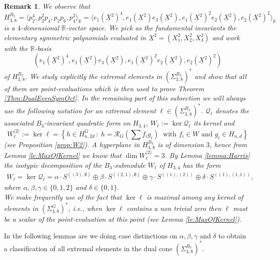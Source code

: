 \documentclass[11pt,a4paper]{amsart}
\numberwithin{equation}{section}
\newtheorem{remark}[thm]{Remark}
\theoremstyle{definition}
\newcommand{\R}{\mathbb{R}}
\numberwithin{thm}{section}
\theoremstyle{break}
\numberwithin{subcase}{case}
\begin{document}
 \begin{remark}\label{rmk:isotypic decomp H38Bn}
 We observe that \[ H_{3,8}^{B_3} = \langle p_2^4, p_2^2 p_4, p_2p_6, p_4^2 \rangle_\R = \langle e_1(\underline{X}^2)^4, e_1(\underline{X}^2)e_3(\underline{X}^2), e_1(\underline{X}^2)^2e_2(\underline{X}^2), e_2(\underline{X}^2)^2 \rangle_\R \] is a $4$-dimensional $\R$-vector space. We pick as the fundamental invariants the elementary symmetric polynomials evaluated in $\underline{X}^2=(X_1^2,X_2^2,X_3^2)$ and work with the $\R$-basis $$\left(e_1(\underline{X}^2)^4, e_1(\underline{X}^2)e_3(\underline{X}^2), e_1(\underline{X}^2)^2 e_2(\underline{X}^2), e_2(\underline{X}^2)^2\right)$$ of $H_{3,8}
^{B_3}$. We study explicitly the extremal elements in $\left( \Sigma_{3,8}^{B_3}\right)^\ast$ and show that all of them are point-evaluations which is then used to prove Theorem \ref{Thm:DualEvenSymOct}. In the remaining part of this subsection we will always use the following notation for an extremal element $\ell \in \left( \Sigma_{3,8}^{B_3}\right)^\ast$. $\mathcal{Q}_\ell$ denotes the associated $B_3$-invariant quadratic form on $H_{3,4}$, $W_\ell := \ker \mathcal{Q}_\ell$ its kernel and $$W^{\langle 2 \rangle}_\ell := \ker \ell = \left\{ h\in H_{n,2d}^G\,:\;h=\mathcal{R}_G \left(\sum f_i g_i\right)\;\text{ with } f_i \in W \text{ and  }g_i \in H_{n,d}\right\}$$ (see Proposition \ref{prop:W2}). A hyperplane in $H_{3,8}^{B_3}$ is of dimension $3$, hence from Lemma \ref{le:MaxOfKernel} we know that $\dim W^{\langle 2 \rangle}_\ell = 3$. By Lemma \ref{lemma:Harris} the isotypic decomposition of the $B_3$-submodule $W_\ell$ of $H_{3,4}$ has the form \begin{align*}
    W_\ell = \ker \mathcal{Q}_\ell = \alpha \cdot {S}^{((3),\emptyset)} \oplus \beta \cdot {S}^{((2,1),\emptyset)} \oplus \gamma \cdot {S}^{((1),(2))} \oplus \delta \cdot {S}^{((1),(1,1))},
\end{align*} where $\alpha, \beta, \gamma \in \{0,1,2\}$ and $\delta \in \{0,1\}$. \\
We make frequently use of the fact that $\ker \ell$ is maximal among any kernel of elements in $\left( \Sigma_{3,8}^G\right)^\ast$, i.e., when $\ker \ell$ contains a non trivial zero then $\ell$ must be a scalar of the point-evaluation at this point (see Lemma \ref{le:MaxOfKernel}).
 \end{remark}
 In the following lemmas are we doing case distinctions on $\alpha,\beta,\gamma$ and $\delta$ to obtain a classification of all extremal elements in the dual cone $\left( \Sigma_{3,8}^{B_3} \right)^\ast$.
 
\end{document}
